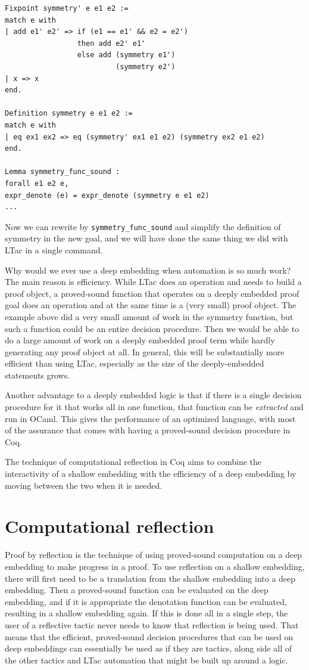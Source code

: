 \documentclass{puthesis}
\begin{document}
\begin{verbatim}
Fixpoint symmetry' e e1 e2 := 
match e with
| add e1' e2' => if (e1 == e1' && e2 = e2') 
                 then add e2' e1' 
                 else add (symmetry e1') 
                          (symmetry e2')
| x => x
end.

Definition symmetry e e1 e2 :=
match e with
| eq ex1 ex2 => eq (symmetry' ex1 e1 e2) (symmetry ex2 e1 e2)
end.

Lemma symmetry_func_sound : 
forall e1 e2 e,
expr_denote (e) = expr_denote (symmetry e e1 e2)
...
\end{verbatim}

Now we can rewrite by \lstinline|symmetry_func_sound| and simplify the definition
of symmetry in the new goal, and we will have done the same thing we
did with LTac in a single command.

Why would we ever use a deep embedding when automation is so much
work? The main reason is efficiency. While LTac does an operation and
needs to build a proof object, a proved-sound function that operates on
a deeply embedded proof goal does an operation and at the same time is
a (very small) proof object. The example above did a very small amount
of work in the symmetry function, but such a function could be an
entire decision procedure. Then we would be able to do a large
amount of work on a deeply embedded proof term while hardly generating
any proof object at all. In general, this will be substantially more
efficient than using LTac, especially as the size of the
deeply-embedded statements grows. 

Another advantage to a deeply embedded logic is that if there is a
single decision procedure for it that works all in one function, that
function can be \emph{extracted} and run in OCaml. This gives the
performance of an optimized language, with most of the assurance that
comes with having a proved-sound decision procedure in Coq.

The technique of computational reflection in Coq aims to combine the
interactivity of a shallow embedding with the efficiency of a deep
embedding by moving between the two when it is needed.

\section{Computational reflection}

Proof by reflection is the technique of using proved-sound computation
on a deep embedding to make progress in a proof. To use reflection on
a shallow embedding, there will first need to be a translation from
the shallow embedding into a deep embedding. Then a proved-sound
function can be evaluated on the deep embedding, and if it is
appropriate the denotation function can be evaluated, resulting in a
shallow embedding again.  If this is done all in a single step, the
user of a reflective tactic never needs to know that reflection is
being used. That means that the efficient, proved-sound decision
procedures that can be used on deep embeddings can essentially be used
as if they are tactics, along side all of the other tactics and LTac
automation that might be built up around a logic.
\end{document}
